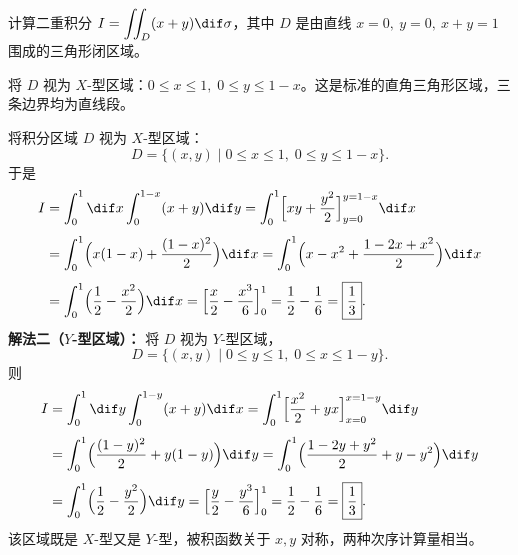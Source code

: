 \documentclass[answer]{THUExam}
\begin{document}
\newpage
{}

\begin{problem}
计算二重积分 $\displaystyle I=\iint_D (x+y)\dif\sigma$，其中 $D$ 是由直线 $x=0,\ y=0,\ x+y=1$ 围成的三角形闭区域。
\end{problem}
\begin{note}
将 $D$ 视为 $X$-型区域：$0\le x\le 1,\;0\le y\le 1-x$。这是标准的直角三角形区域，三条边界均为直线段。

\begin{center}
\end{center}
\end{note}
\begin{solution}
将积分区域 $D$ 视为 $X$-型区域：
\[
D=\{(x,y)\mid 0\le x\le 1,\; 0\le y\le 1-x\}.
\]
于是
\begin{align*}
I &= \int_0^1\dif x\int_0^{1-x}(x+y)\dif y
   = \int_0^1 \Bigl[xy+\frac{y^2}{2}\Bigr]_{y=0}^{y=1-x}\dif x \\[4pt]
  &= \int_0^1 \Bigl(x(1-x)+\frac{(1-x)^2}{2}\Bigr)\dif x
   = \int_0^1 \Bigl(x-x^2+\frac{1-2x+x^2}{2}\Bigr)\dif x \\[4pt]
  &= \int_0^1 \Bigl(\frac{1}{2}-\frac{x^2}{2}\Bigr)\dif x
   = \Bigl[\frac{x}{2}-\frac{x^3}{6}\Bigr]_0^1
   = \frac{1}{2}-\frac{1}{6}
   = \boxed{\dfrac{1}{3}}.
\end{align*}
\textbf{解法二（$Y$-型区域）：} 将 $D$ 视为 $Y$-型区域，
\[
D=\{(x,y)\mid 0\le y\le 1,\; 0\le x\le 1-y\}.
\]
则
\begin{align*}
I &= \int_0^1\dif y\int_0^{1-y}(x+y)\dif x
   = \int_0^1 \Bigl[\frac{x^2}{2}+yx\Bigr]_{x=0}^{x=1-y}\dif y \\[4pt]
  &= \int_0^1 \Bigl(\frac{(1-y)^2}{2}+y(1-y)\Bigr)\dif y
   = \int_0^1 \Bigl(\frac{1-2y+y^2}{2}+y-y^2\Bigr)\dif y \\[4pt]
  &= \int_0^1 \Bigl(\frac{1}{2}-\frac{y^2}{2}\Bigr)\dif y
   = \Bigl[\frac{y}{2}-\frac{y^3}{6}\Bigr]_0^1
   = \frac{1}{2}-\frac{1}{6}
   = \boxed{\dfrac{1}{3}}.
\end{align*}
该区域既是 $X$-型又是 $Y$-型，被积函数关于 $x,y$ 对称，两种次序计算量相当。
\end{solution}
\end{document}
